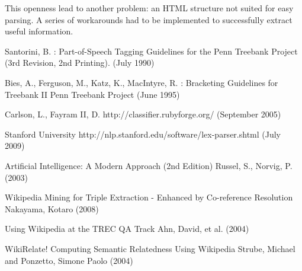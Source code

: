 \documentclass{llncs}
\begin{document}
This openness lead to another problem: an HTML structure not suited for easy parsing. A series of workarounds had to be implemented to successfully extract useful information.

\newpage
%
%
\begin{thebibliography}{}
%
Santorini, B. :
Part-of-Speech Tagging Guidelines for the
Penn Treebank Project (3rd Revision, 2nd Printing).
(July 1990)

Bies, A., Ferguson, M., Katz, K., MacIntyre, R. :
Bracketing Guidelines for Treebank II
Penn Treebank Project
(June 1995)

Carlson, L., Fayram II, D.
http://classifier.rubyforge.org/
(September 2005)

Stanford University
http://nlp.stanford.edu/software/lex-parser.shtml
(July 2009)

Artificial Intelligence: A Modern Approach (2nd Edition)
Russel, S., Norvig, P.
(2003)

Wikipedia Mining for Triple Extraction - Enhanced by Co-reference Resolution
Nakayama, Kotaro
(2008)

Using Wikipedia at the TREC QA Track
Ahn, David, et al.
(2004)

WikiRelate! Computing Semantic Relatedness Using Wikipedia
Strube, Michael and Ponzetto, Simone Paolo
(2004)

\end{thebibliography}
\end{document}
